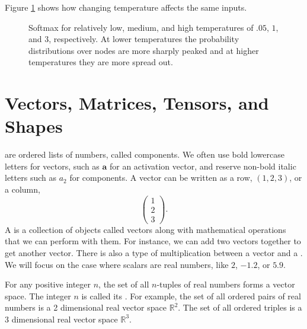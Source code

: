 Figure \ref{abridged_softmax_temperatures} shows how changing temperature affects the same inputs.

\begin{figure}[htbp]
\centering
{}
\caption[Jeff Yoshimi.]{Softmax for relatively low, medium, and high temperatures of $.05$, $1$, and $3$, respectively. At lower temperatures the probability distributions over nodes are more sharply peaked and at higher temperatures they are more spread out.}
\label{abridged_softmax_temperatures}
\end{figure}

\section{Vectors, Matrices, Tensors, and Shapes}

 are ordered lists of numbers, called components. We often use bold lowercase letters for vectors, such as $\mathbf{a}$ for an activation vector, and reserve non-bold italic letters such as $a_2$ for components. A vector can be written as a row, $(1,2,3)$, or a column,
\[
\begin{pmatrix}1\\2\\3\end{pmatrix}.
\]
A  is a collection of objects called vectors along with mathematical operations that we can perform with them. For instance, we can add two vectors together to get another vector. There is also a type of multiplication between a vector and a . We will focus on the case where scalars are real numbers, like $2$, $-1.2$, or $5.9$.

For any positive integer $n$, the set of all $n$-tuples of real numbers forms a vector space. The integer $n$ is called its . For example, the set of all ordered pairs of real numbers is a 2 dimensional real vector space $\mathbb{R}^2$. The set of all ordered triples is a 3 dimensional real vector space $\mathbb{R}^3$.

